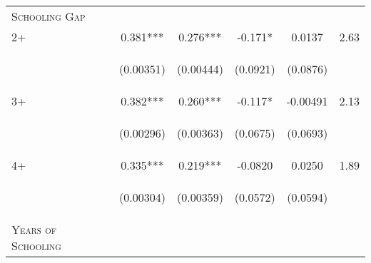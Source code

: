 \documentclass{article}[11pt,subeqn]
\begin{document}
\begin{spacing}{1.25}
\begin{table}[!htbp]
\begin{center}
\begin{tabular}{lccccc}
\midrule
\textsc{Schooling Gap} & & & & & \\
2+ & 0.381*** & 0.276*** &	-0.171* & 0.0137 & 2.63\\
\vspace{4pt} & \begin{footnotesize}(0.00351)\end{footnotesize} & \begin{footnotesize}(0.00444)\end{footnotesize} & \begin{footnotesize}(0.0921)\end{footnotesize} & \begin{footnotesize}(0.0876)\end{footnotesize} & \begin{footnotesize}\end{footnotesize} \\
3+ & 0.382*** & 0.260*** & -0.117* & -0.00491 & 2.13\\
\vspace{4pt} & \begin{footnotesize}(0.00296)\end{footnotesize} & \begin{footnotesize}(0.00363)\end{footnotesize} & \begin{footnotesize}(0.0675)\end{footnotesize} & \begin{footnotesize}(0.0693)\end{footnotesize} & \begin{footnotesize}\end{footnotesize} \\
4+ & 0.335*** & 0.219*** & -0.0820 & 0.0250 & 1.89\\
\vspace{4pt} & \begin{footnotesize}(0.00304)\end{footnotesize} & \begin{footnotesize}(0.00359)\end{footnotesize} & \begin{footnotesize}(0.0572)\end{footnotesize} & \begin{footnotesize}(0.0594)\end{footnotesize} & \begin{footnotesize}\end{footnotesize} \\
\midrule
\textsc{Years of Schooling} & & & & & \\

\end{tabular}
\end{center}
\end{table}
\end{spacing}
\end{document}
